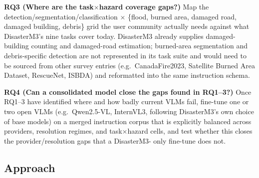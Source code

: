 \textbf{RQ3 (Where are the task$\times$hazard coverage gaps?)} Map the
detection/segmentation/classification $\times$ \{flood, burned area, damaged
road, damaged building, debris\} grid the user community actually needs
against what DisasterM3's nine tasks cover today. DisasterM3 already supplies
damaged-building counting and damaged-road estimation; burned-area
segmentation and debris-specific detection are not represented in its task
suite and would need to be sourced from other survey entries (e.g.\
CanadaFire2023, Satellite Burned Area Dataset, RescueNet, ISBDA) and
reformatted into the same instruction schema.

\textbf{RQ4 (Can a consolidated model close the gaps found in RQ1--3?)} Once
RQ1--3 have identified where and how badly current VLMs fail, fine-tune one
or two open VLMs (e.g.\ Qwen2.5-VL, InternVL3, following DisasterM3's own
choice of base models) on a merged instruction corpus that is explicitly
balanced across providers, resolution regimes, and task$\times$hazard cells,
and test whether this closes the provider/resolution gaps that a DisasterM3-
only fine-tune does not.

\subsection{Approach}

